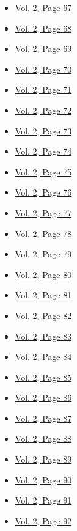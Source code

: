 \begin{itemize}
\begin{itemize}
  \item
    \protect\hyperlink{g-page-279}{Vol. 2, Page 67}
  \item
    \protect\hyperlink{g-page-280}{Vol. 2, Page 68}
  \item
    \protect\hyperlink{g-page-281}{Vol. 2, Page 69}
  \item
    \protect\hyperlink{g-page-282}{Vol. 2, Page 70}
  \item
    \protect\hyperlink{g-page-283}{Vol. 2, Page 71}
  \item
    \protect\hyperlink{g-page-284}{Vol. 2, Page 72}
  \item
    \protect\hyperlink{g-page-285}{Vol. 2, Page 73}
  \item
    \protect\hyperlink{g-page-286}{Vol. 2, Page 74}
  \item
    \protect\hyperlink{g-page-287}{Vol. 2, Page 75}
  \item
    \protect\hyperlink{g-page-288}{Vol. 2, Page 76}
  \item
    \protect\hyperlink{g-page-289}{Vol. 2, Page 77}
  \item
    \protect\hyperlink{g-page-290}{Vol. 2, Page 78}
  \item
    \protect\hyperlink{g-page-291}{Vol. 2, Page 79}
  \item
    \protect\hyperlink{g-page-292}{Vol. 2, Page 80}
  \item
    \protect\hyperlink{g-page-293}{Vol. 2, Page 81}
  \item
    \protect\hyperlink{g-page-294}{Vol. 2, Page 82}
  \item
    \protect\hyperlink{g-page-295}{Vol. 2, Page 83}
  \item
    \protect\hyperlink{g-page-296}{Vol. 2, Page 84}
  \item
    \protect\hyperlink{g-page-297}{Vol. 2, Page 85}
  \item
    \protect\hyperlink{g-page-298}{Vol. 2, Page 86}
  \item
    \protect\hyperlink{g-page-299}{Vol. 2, Page 87}
  \item
    \protect\hyperlink{g-page-300}{Vol. 2, Page 88}
  \item
    \protect\hyperlink{g-page-301}{Vol. 2, Page 89}
  \item
    \protect\hyperlink{g-page-302}{Vol. 2, Page 90}
  \item
    \protect\hyperlink{g-page-303}{Vol. 2, Page 91}
  \item
    \protect\hyperlink{g-page-304}{Vol. 2, Page 92}

\end{itemize}
\end{itemize}

